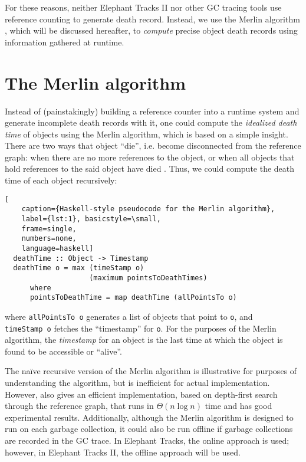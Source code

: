 For these reasons, neither Elephant Tracks II nor other GC tracing tools \citep{MemInsight, ElephantTracks}
use reference counting to generate death record. Instead, we use the Merlin algorithm \citep{Merlin}, which
will be discussed hereafter, to \emph{compute} precise object death records using information gathered
at runtime.

\section{The Merlin algorithm}
Instead of (painstakingly) building a reference counter into a runtime system and generate incomplete death
records with it, one could compute the \emph{idealized death time} of objects using the Merlin algorithm, which
is based on a simple insight. There are two ways that object ``die'', i.e. become disconnected from the reference
graph: when there are no more references to the object, or when all objects that hold references to the said object
have died \citep{Merlin, ElephantTracks}. Thus, we could compute the death time of each object recursively:
\newpage
\begin{lstlisting}[
    caption={Haskell-style pseudocode for the Merlin algorithm},
    label={lst:1}, basicstyle=\small,
    frame=single,
    numbers=none,
    language=haskell]
  deathTime :: Object -> Timestamp
  deathTime o = max (timeStamp o)
                    (maximum pointsToDeathTimes)
      where
      pointsToDeathTime = map deathTime (allPointsTo o)
\end{lstlisting}
where  \lstinline{allPointsTo o} generates a list of objects that point to \lstinline{o}, and\\
\lstinline{timeStamp o} fetches the ``timestamp'' for \lstinline{o}. For the purposes of the Merlin algorithm,
the \emph{timestamp} for an object is the last time at which the object is found to be accessible or ``alive''.

The na\"{i}ve recursive version of the Merlin algorithm is illustrative for purposes of understanding the
algorithm, but is inefficient for actual implementation. However, \cite{Merlin} also gives an efficient implementation, based
on depth-first search through the reference graph, that runs in $\Theta(n \log n)$ time and has good
experimental results. Additionally, although the Merlin algorithm is designed to run on each garbage collection,
it could also be run offline if garbage collections are recorded in the GC trace. In Elephant Tracks, the online
approach is used; however, in Elephant Tracks II, the offline approach will be used.

